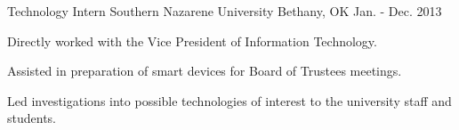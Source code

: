 \begin{cventries}

\cventry
{Technology Intern} %
{Southern Nazarene University} %
{Bethany, OK} %
{Jan. - Dec. 2013} %
{
	\begin{cvitems} %
		\item{Directly worked with the Vice President of Information Technology.}
		\item{Assisted in preparation of smart devices for Board of Trustees meetings.}
		\item{Led investigations into possible technologies of interest to the university staff and students.}
	\end{cvitems}
}





\end{cventries}
